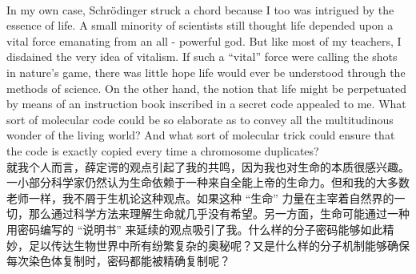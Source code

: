 \documentclass{article}
\begin{document}
\\
In my own case, Schrödinger struck a chord because I too was intrigued by the essence of life. A small minority of scientists still thought life depended upon a vital force emanating from an all - powerful god. But like most of my teachers, I disdained the very idea of vitalism. If such a “vital” force were calling the shots in nature’s game, there was little hope life would ever be understood through the methods of science. On the other hand, the notion that life might be perpetuated by means of an instruction book inscribed in a secret code appealed to me. What sort of molecular code could be so elaborate as to convey all the multitudinous wonder of the living world? And what sort of molecular trick could ensure that the code is exactly copied every time a chromosome duplicates?\\
就我个人而言，薛定谔的观点引起了我的共鸣，因为我也对生命的本质很感兴趣。一小部分科学家仍然认为生命依赖于一种来自全能上帝的生命力。但和我的大多数老师一样，我不屑于生机论这种观点。如果这种 “生命” 力量在主宰着自然界的一切，那么通过科学方法来理解生命就几乎没有希望。另一方面，生命可能通过一种用密码编写的 “说明书” 来延续的观点吸引了我。什么样的分子密码能够如此精妙，足以传达生物世界中所有纷繁复杂的奥秘呢？又是什么样的分子机制能够确保每次染色体复制时，密码都能被精确复制呢？ \\
\end{document}
